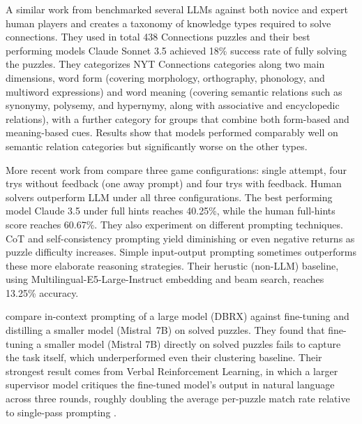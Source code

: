 A similar work from \citeauthor{samadarshiConnectingDotsEvaluating2024} benchmarked several LLMs against both novice and expert human players and creates a taxonomy of knowledge types required to solve connections. They used in total 438 Connections puzzles and their best performing models Claude Sonnet 3.5 achieved 18\% success rate of fully solving the puzzles. They categorizes NYT Connections categories along two main dimensions, word form (covering morphology, orthography, phonology, and multiword expressions) and word meaning (covering semantic relations such as synonymy, polysemy, and hypernymy, along with associative and encyclopedic relations), with a further category for groups that combine both form-based and meaning-based cues. Results show that models performed comparably well on semantic relation categories but significantly worse on the other types.

More recent work from \citeauthor{loredolopezNYTConnectionsDeceptivelySimple2025} compare three game configurations: single attempt, four trys without feedback (one away prompt) and four trys with feedback. Human solvers outperform LLM under all three configurations. The best performing model Claude 3.5 under full hints reaches 40.25\%, while the human full-hints score reaches 60.67\%. They also experiment on different prompting techniques. \ac{CoT} and self-consistency prompting yield diminishing or even negative returns as puzzle difficulty increases. Simple input-output prompting sometimes outperforms these more elaborate reasoning strategies. Their herustic (non-LLM) baseline, using Multilingual-E5-Large-Instruct embedding and beam search, reaches 13.25\% accuracy.

\citeauthor{zhangLearningSemanticComplexities} compare in-context prompting of a large model (DBRX) against fine-tuning and distilling a smaller model (Mistral~7B) on solved puzzles. They found that fine-tuning a smaller model (Mistral 7B) directly on solved puzzles fails to capture the task itself, which underperformed even their clustering baseline. Their strongest result comes from Verbal Reinforcement Learning, in which a larger supervisor model critiques the fine-tuned model's output in natural language across three rounds, roughly doubling the average per-puzzle match rate relative to single-pass prompting \cite{zhangLearningSemanticComplexities}.

